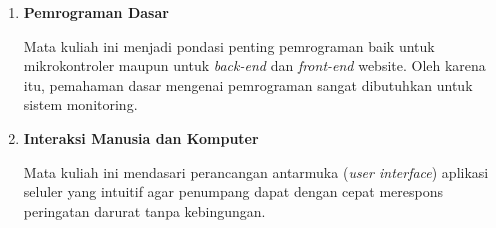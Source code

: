 \begin{enumerate}[label=\alph*.]
    \item \textbf{Pemrograman Dasar}

    Mata kuliah ini menjadi pondasi penting pemrograman baik untuk mikrokontroler maupun untuk \textit{back-end} dan \textit{front-end} website. Oleh karena itu, pemahaman dasar mengenai pemrograman sangat dibutuhkan untuk sistem monitoring.

    \item \textbf{Interaksi Manusia dan Komputer}

    Mata kuliah ini mendasari perancangan antarmuka (\textit{user interface}) aplikasi seluler yang intuitif agar penumpang dapat dengan cepat merespons peringatan darurat tanpa kebingungan.

\end{enumerate}

